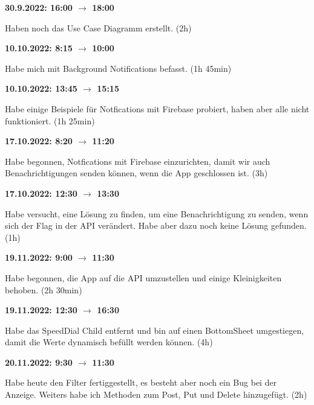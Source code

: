 \vspace{0.5cm}

\textbf{30.9.2022: 16:00 $\rightarrow$ 18:00} \

Haben noch das Use Case Diagramm erstellt. (2h)

\vspace{0.5cm}

\textbf{10.10.2022: 8:15 $\rightarrow$ 10:00} \

Habe mich mit Background Notifications befasst. (1h 45min)

\vspace{0.5cm}

\textbf{10.10.2022: 13:45 $\rightarrow$ 15:15} \

Habe einige Beispiele für Notfications mit Firebase probiert, haben aber alle nicht funktioniert. (1h 25min)

\vspace{0.5cm}

\textbf{17.10.2022: 8:20 $\rightarrow$ 11:20} \

Habe begonnen, Notfications mit Firebase einzurichten, damit wir auch Benachrichtigungen senden können, wenn die App geschlossen ist. (3h)

\vspace{0.5cm}

\textbf{17.10.2022: 12:30 $\rightarrow$ 13:30} \

Habe versucht, eine Lösung zu finden, um eine Benachrichtigung zu senden, wenn sich der Flag in der API verändert. Habe aber dazu noch keine Lösung gefunden. (1h)

\vspace{0.5cm}

\textbf{19.11.2022: 9:00 $\rightarrow$ 11:30} \

Habe begonnen, die App auf die API umzustellen und einige Kleinigkeiten behoben. (2h 30min)

\vspace{0.5cm}

\textbf{19.11.2022: 12:30 $\rightarrow$ 16:30} \

Habe das SpeedDial Child entfernt und bin auf einen BottomSheet umgestiegen, damit die Werte dynamisch befüllt werden können. (4h)

\vspace{0.5cm}

\textbf{20.11.2022: 9:30 $\rightarrow$ 11:30} \

Habe heute den Filter fertiggestellt, es besteht aber noch ein Bug bei der Anzeige. Weiters habe ich Methoden zum Post, Put und Delete hinzugefügt. (2h)

